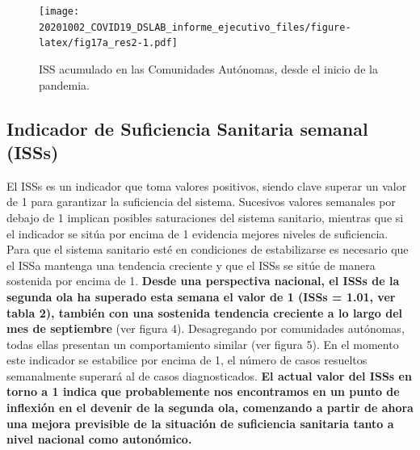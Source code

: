 \documentclass[
  11pt,
]{article}
\begin{document}
\vspace{0.2cm}

\begin{figure}
\centering
\texttt{[image: 20201002\_COVID19\_DSLAB\_informe\_ejecutivo\_files/figure-latex/fig17a\_res2-1.pdf]}
\caption{\label{fig:fig17a_res} ISS acumulado en las Comunidades
Autónomas, desde el inicio de la pandemia.}
\end{figure}

\clearpage

\hypertarget{indicador-de-suficiencia-sanitaria-semanal-isss}{%
\subsection{Indicador de Suficiencia Sanitaria semanal
(ISSs)}\label{indicador-de-suficiencia-sanitaria-semanal-isss}}

El ISSs es un indicador que toma valores positivos, siendo clave superar
un valor de 1 para garantizar la suficiencia del sistema. Sucesivos
valores semanales por debajo de 1 implican posibles saturaciones del
sistema sanitario, mientras que si el indicador se sitúa por encima de 1
evidencia mejores niveles de suficiencia. Para que el sistema sanitario
esté en condiciones de estabilizarse es necesario que el ISSa mantenga
una tendencia creciente y que el ISSs se sitúe de manera sostenida por
encima de 1. \textbf{Desde una perspectiva nacional, el ISSs de la
segunda ola ha superado esta semana el valor de 1 (ISSs = 1.01, ver
tabla 2), también con una sostenida tendencia creciente a lo largo del
mes de septiembre} (ver figura 4). Desagregando por comunidades
autónomas, todas ellas presentan un comportamiento similar (ver figura
5). En el momento este indicador se estabilice por encima de 1, el
número de casos resueltos semanalmente superará al de casos
diagnosticados. \textbf{El actual valor del ISSs en torno a 1 indica que
probablemente nos encontramos en un punto de inflexión en el devenir de
la segunda ola, comenzando a partir de ahora una mejora previsible de la
situación de suficiencia sanitaria tanto a nivel nacional como
autonómico.}
\end{document}
